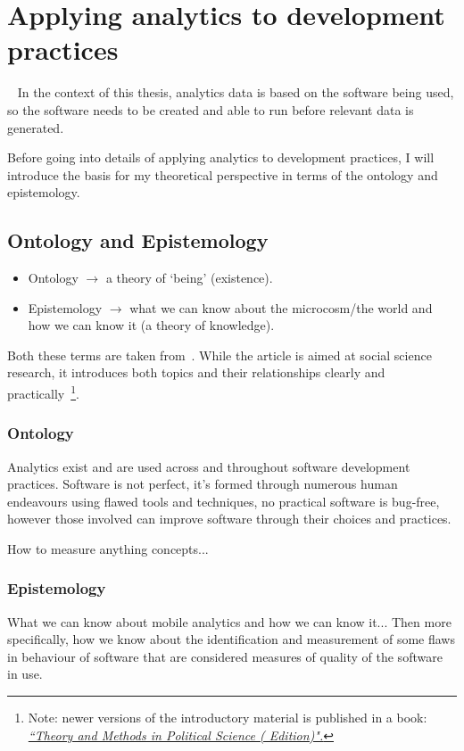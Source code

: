 \chapter{Applying analytics to development practices}~\label{chapter-applying-analytics-to-development-practices}
In the context of this thesis, analytics data is based on the software being used, so the software needs to be created and able to run before relevant data is generated.

Before going into details of applying analytics to development practices, I will introduce the basis for my theoretical perspective in terms of the ontology and epistemology.

\section{Ontology and Epistemology}
\begin{itemize}
    \item Ontology \( \rightarrow \) a theory of `being' (existence).
    \item Epistemology \( \rightarrow \) what we can know about the microcosm/the world and how we can know it (a theory of knowledge).
\end{itemize}

Both these terms are taken from~\cite{marsh2002skin}. While the article is aimed at social science research, it introduces both topics and their relationships clearly and practically~\footnote{Note: newer versions of the introductory material is published in a book: \href{https://www.macmillanihe.com/page/detail/Theory-and-Methods-in-Political-Science/?K=9781137603517}{\emph{``Theory and Methods in Political Science ( Edition)".}}}.

\subsection{Ontology}
Analytics exist and are used across and throughout software development practices. Software is not perfect, it's formed through numerous human endeavours using flawed tools and techniques, no practical software is bug-free, however those involved can improve software through their choices and practices.

How to measure anything concepts...

\subsection{Epistemology}
What we can know about mobile analytics and how we can know it... Then more specifically, how we know about the identification and measurement of some flaws in behaviour of software that are considered measures of quality of the software in use. 

